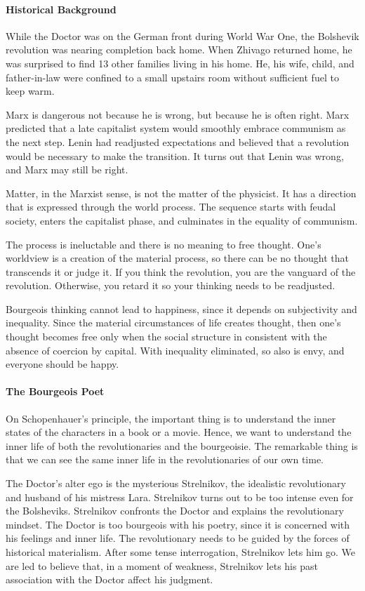 \paragraph{Historical Background}
While the Doctor was on the German front during World War One, the Bolshevik revolution was nearing completion back home. When Zhivago returned home, he was surprised to find 13 other families living in his home. He, his wife, child, and father-in-law were confined to a small upstairs room without sufficient fuel to keep warm.

Marx is dangerous not because he is wrong, but because he is often right. Marx predicted that a late capitalist system would smoothly embrace communism as the next step. Lenin had readjusted expectations and believed that a revolution would be necessary to make the transition. It turns out that Lenin was wrong, and Marx may still be right.

Matter, in the Marxist sense, is not the matter of the physicist. It has a direction that is expressed through the world process. The sequence starts with feudal society, enters the capitalist phase, and culminates in the equality of communism.

The process is ineluctable and there is no meaning to free thought. One's worldview is a creation of the material process, so there can be no thought that transcends it or judge it. If you think the revolution, you are the vanguard of the revolution. Otherwise, you retard it so your thinking needs to be readjusted.

Bourgeois thinking cannot lead to happiness, since it depends on subjectivity and inequality. Since the material circumstances of life creates thought, then one's thought becomes free only when the social structure in consistent with the absence of coercion by capital. With inequality eliminated, so also is envy, and everyone should be happy.

\paragraph{The Bourgeois Poet}
On Schopenhauer's principle, the important thing is to understand the inner states of the characters in a book or a movie. Hence, we want to understand the inner life of both the revolutionaries and the bourgeoisie. The remarkable thing is that we can see the same inner life in the revolutionaries of our own time.

The Doctor's alter ego is the mysterious Strelnikov, the idealistic revolutionary and husband of his mistress Lara. Strelnikov turns out to be too intense even for the Bolsheviks. Strelnikov confronts the Doctor and explains the revolutionary mindset. The Doctor is too bourgeois with his poetry, since it is concerned with his feelings and inner life. The revolutionary needs to be guided by the forces of historical materialism. After some tense interrogation, Strelnikov lets him go. We are led to believe that, in a moment of weakness, Strelnikov lets his past association with the Doctor affect his judgment.

